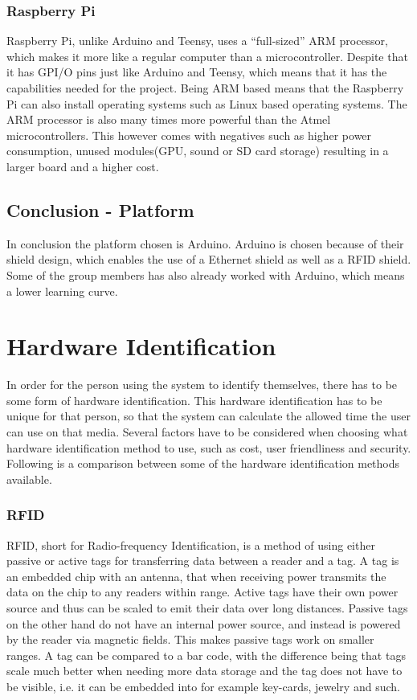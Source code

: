 \subsubsection{Raspberry Pi}
Raspberry Pi, unlike Arduino and Teensy, uses a ``full-sized'' ARM processor, which makes it more like a regular computer than a microcontroller. Despite that it has GPI/O pins just like Arduino and Teensy, which means that it has the capabilities needed for the project. Being ARM based means that the Raspberry Pi can also install operating systems such as Linux based operating systems. The ARM processor is also many times more powerful than the Atmel microcontrollers. This however comes with negatives such as higher power consumption, unused modules(GPU, sound or SD card storage) resulting in a larger board and a higher cost. \citep{raspberrypi}

\subsection{Conclusion - Platform}
In conclusion the platform chosen is Arduino. Arduino is chosen because of their shield design, which enables the use of a Ethernet shield as well as a RFID shield. Some of the group members has also already worked with Arduino, which means a lower learning curve.

\section{Hardware Identification}
In order for the person using the system to identify themselves, there has to be some form of hardware identification. This hardware identification has to be unique for that person, so that the system can calculate the allowed time the user can use on that media. Several factors have to be considered when choosing what hardware identification method to use, such as cost, user friendliness and security. Following is a comparison between some of the hardware identification methods available.

\subsubsection{RFID}
RFID, short for Radio-frequency Identification, is a method of using either passive or active tags for transferring data between a reader and a tag. A tag is an embedded chip with an antenna, that when receiving power transmits the data on the chip to any readers within range. Active tags have their own power source and thus can be scaled to emit their data over long distances. Passive tags on the other hand do not have an internal power source, and instead is powered by the reader via magnetic fields. This makes passive tags work on smaller ranges.\citep{rfidAndNfc} A tag can be compared to a bar code, with the difference being that tags scale much better when needing more data storage and the tag does not have to be visible, i.e. it can be embedded into for example key-cards, jewelry and such.

